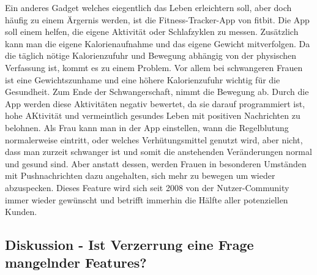 Ein anderes Gadget welches eiegentlich das Leben erleichtern soll, aber doch häufig zu einem Ärgernis werden, ist die Fitness-Tracker-App von fitbit. Die App soll einem helfen, die eigene Aktivität oder Schlafzyklen zu messen. Zusätzlich kann man die eigene Kalorienaufnahme und das eigene Gewicht mitverfolgen. Da die täglich nötige Kalorienzufuhr und Bewegung abhängig von der physischen Verfassung ist, kommt es zu einem Problem. Vor allem bei schwangeren Frauen ist eine Gewichtszunhame und eine höhere Kalorienzufuhr wichtig für die Gesundheit. Zum Ende der Schwangerschaft, nimmt die Bewegung ab. Durch die App werden diese Aktivitäten negativ bewertet, da sie darauf programmiert ist, hohe AKtivität und vermeintlich gesundes Leben mit positiven Nachrichten zu belohnen. 
Als Frau kann man in der App einstellen, wann die Regelblutung normalerweise eintritt, oder welches Verhütungsmittel genutzt wird, aber nicht, dass man zurzeit schwanger ist und somit die anstehenden Veränderungen normal und gesund sind. 
Aber anstatt dessen, werden Frauen in besonderen Umständen mit Pushnachrichten dazu angehalten, sich mehr zu bewegen um wieder abzuspecken. 
Dieses Feature wird sich seit 2008 von der Nutzer-Community immer wieder gewünscht und betrifft immerhin die Hälfte aller potenziellen Kunden. 


\subsection[feature]{Diskussion - Ist Verzerrung eine Frage mangelnder Features?}

